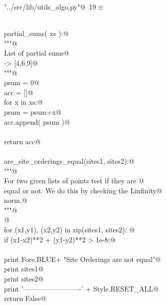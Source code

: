 \documentclass[11.5pt]{report}
\begin{document}
\begin{flushleft} \small\label{scrap10}\raggedright\small
{} \verb@"../src/lib/utils_algo.py"@\nobreak\ {\footnotesize {19}}$\equiv$
\vspace{-1ex}
\begin{list}{}{} \item
\mbox{}\verb@@\\
\mbox{}\verb@def partial_sums( xs ):@\\
\mbox{}\verb@    """@\\
\mbox{}\verb@    List of partial sums@\\
\mbox{}\verb@    [4,2,3] -> [4,6,9]@\\
\mbox{}\verb@    """@\\
\mbox{}\verb@    psum = 0@\\
\mbox{}\verb@    acc = []@\\
\mbox{}\verb@    for x in xs:@\\
\mbox{}\verb@        psum = psum+x@\\
\mbox{}\verb@        acc.append( psum )@\\
\mbox{}\verb@@\\
\mbox{}\verb@    return acc@\\
\mbox{}\verb@@\\
\mbox{}\verb@def are_site_orderings_equal(sites1, sites2):@\\
\mbox{}\verb@    """@\\
\mbox{}\verb@    For two given lists of points test if they are @\\
\mbox{}\verb@    equal or not. We do this by checking the Linfinity@\\
\mbox{}\verb@    norm.@\\
\mbox{}\verb@    """@\\
\mbox{}\verb@    @\\
\mbox{}\verb@    for (x1,y1), (x2,y2) in zip(sites1, sites2): @\\
\mbox{}\verb@        if (x1-x2)**2 + (y1-y2)**2 > 1e-8:@\\
\mbox{}\verb@@\\
\mbox{}\verb@            print Fore.BLUE+ "Site Orderings are not equal"@\\
\mbox{}\verb@            print sites1@\\
\mbox{}\verb@            print sites2@\\
\mbox{}\verb@            print '-------------------------' + Style.RESET_ALL@\\
\mbox{}\verb@            return False@\\

\end{list}
\end{flushleft}
\end{document}
